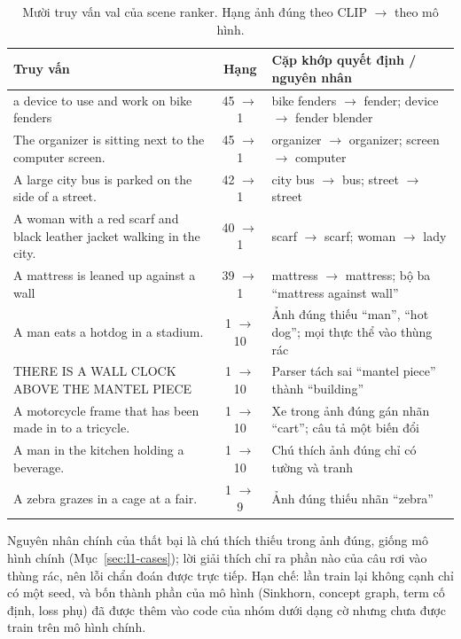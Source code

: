 \begin{table}[!htb]
\centering
\caption{Mười truy vấn val của scene ranker. Hạng ảnh đúng theo CLIP $\to$ theo mô hình.}
\label{tab:app-sr-cases}
\scriptsize
\setlength{\tabcolsep}{2.5pt}
\begin{tabular}{@{}>{\raggedright\arraybackslash}p{3.3cm}c>{\raggedright\arraybackslash}p{3.9cm}@{}}
\toprule
Truy vấn & Hạng & Cặp khớp quyết định / nguyên nhân \\
\midrule
a device to use and work on bike fenders & 45 $\to$ 1 & bike fenders $\to$ fender; device $\to$ fender blender \\
The organizer is sitting next to the computer screen. & 45 $\to$ 1 & organizer $\to$ organizer; screen $\to$ computer \\
A large city bus is parked on the side of a street. & 42 $\to$ 1 & city bus $\to$ bus; street $\to$ street \\
A woman with a red scarf and black leather jacket walking in the city. & 40 $\to$ 1 & scarf $\to$ scarf; woman $\to$ lady \\
A mattress is leaned up against a wall & 39 $\to$ 1 & mattress $\to$ mattress; bộ ba ``mattress against wall'' \\
\midrule
A man eats a hotdog in a stadium. & 1 $\to$ 10 & Ảnh đúng thiếu ``man'', ``hot dog''; mọi thực thể vào thùng rác \\
THERE IS A WALL CLOCK ABOVE THE MANTEL PIECE & 1 $\to$ 10 & Parser tách sai ``mantel piece'' thành ``building'' \\
A motorcycle frame that has been made in to a tricycle. & 1 $\to$ 10 & Xe trong ảnh đúng gán nhãn ``cart''; câu tả một biến đổi \\
A man in the kitchen holding a beverage. & 1 $\to$ 10 & Chú thích ảnh đúng chỉ có tường và tranh \\
A zebra grazes in a cage at a fair. & 1 $\to$ 9 & Ảnh đúng thiếu nhãn ``zebra'' \\
\bottomrule
\end{tabular}
\end{table}

Nguyên nhân chính của thất bại là chú thích thiếu trong ảnh đúng, giống mô hình chính (Mục~\ref{sec:l1-cases}); lời giải thích
chỉ ra phần nào của câu rơi vào thùng rác, nên lỗi chẩn đoán được trực tiếp. Hạn chế: lần train lại không cạnh chỉ có một
seed, và bốn thành phần của mô hình (Sinkhorn, concept graph, term cố định, loss phụ) đã được thêm vào code của nhóm dưới dạng
cờ nhưng chưa được train trên mô hình chính.
